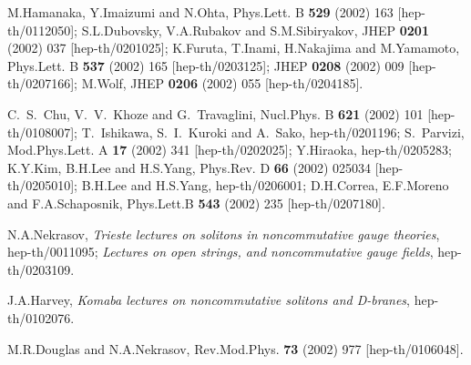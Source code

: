 \documentclass[a4paper,11pt]{article}
\numberwithin{equation}{section}
\begin{document}
\begin{thebibliography}{99}
M.Hamanaka, Y.Imaizumi and N.Ohta,
Phys.Lett. B {\bf 529} (2002) 163
[hep-th/0112050];
S.L.Dubovsky, V.A.Rubakov and S.M.Sibiryakov,
JHEP {\bf 0201} (2002) 037
[hep-th/0201025];
K.Furuta, T.Inami, H.Nakajima and M.Yamamoto,
Phys.Lett. B {\bf 537} (2002) 165
[hep-th/0203125];
JHEP {\bf 0208} (2002) 009
[hep-th/0207166];
M.Wolf,
JHEP {\bf 0206} (2002) 055 [hep-th/0204185].


C.~S.~Chu, V.~V.~Khoze and G.~Travaglini,
Nucl.Phys. B {\bf 621} (2002) 101
[hep-th/0108007];
T.~Ishikawa, S.~I.~Kuroki and A.~Sako,
hep-th/0201196;
S.~Parvizi,
Mod.Phys.Lett. A {\bf 17} (2002) 341 [hep-th/0202025];
Y.Hiraoka,
hep-th/0205283;
K.Y.Kim, B.H.Lee and H.S.Yang,
Phys.Rev. D {\bf 66} (2002) 025034 [hep-th/0205010];
B.H.Lee and H.S.Yang,
hep-th/0206001;
D.H.Correa, E.F.Moreno and F.A.Schaposnik,
Phys.Lett.B {\bf 543} (2002) 235 [hep-th/0207180].

N.A.Nekrasov,
{\em Trieste lectures on solitons in noncommutative gauge theories},
hep-th/0011095;
{\em Lectures on open strings, and noncommutative gauge fields},
hep-th/0203109.

J.A.Harvey,
{\em Komaba lectures on noncommutative solitons and D-branes}, hep-th/0102076.

M.R.Douglas and N.A.Nekrasov,
Rev.Mod.Phys. {\bf 73} (2002) 977 [hep-th/0106048].


\end{thebibliography}
\end{document}
